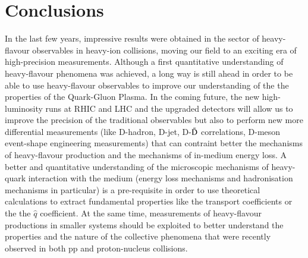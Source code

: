\documentclass{webofc}
\begin{document}
\section{Conclusions}
\label{AAmeasurements}
In the last few years, impressive results were obtained in the sector of heavy-flavour observables in heavy-ion collisions, moving our field to an exciting era of high-precision measurements. 
Although a first quantitative understanding of heavy-flavour phenomena was achieved, a long way is still ahead in order to be able to use heavy-flavour observables to improve our understanding of the 
the properties of the Quark-Gluon Plasma. In the coming future, the new high-luminosity runs at RHIC and LHC and the 
upgraded detectors will allow us to improve the precision of the traditional observables but also to perform new more differential measurements (like D-hadron, D-jet, D-$\rm \bar{D}$ correlations, D-meson event-shape engineering measurements) 
that can contraint better the mechanisms of heavy-flavour production and the mechanisms of in-medium energy loss.  A better and quantitative understanding of the microscopic mechanisms of heavy-quark interaction with the 
medium (energy loss mechanisms and hadronisation mechanisms in particular) is a pre-requisite in order to use theoretical calculations to extract fundamental properties like the transport coefficients or the the $\hat{q}$ coefficient. 
At the same time, measurements of heavy-flavour productions in smaller systems should be exploited to better understand the properties and the nature of the collective phenomena that 
were recently observed in both pp and proton-nucleus collisions. 
\end{document}
